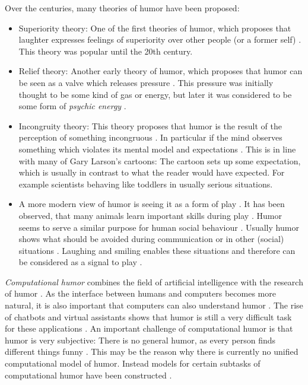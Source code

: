 \documentclass[draft,final,oneside]{vutinfth} %
\begin{document}
Over the centuries, many theories of humor have been proposed: 
\begin{itemize}
\item Superiority theory: One of the first theories of humor, which proposes that laughter expresses feelings of superiority over other people (or a former self) \cite{humorresearch}. This theory was popular until the 20th century.
\item Relief theory: Another early theory of humor, which proposes that humor can be seen as a valve which releases pressure \cite{humorresearch}. This pressure was initially thought to be some kind of gas or energy, but later it was considered to be some form of \textit{psychic energy} \cite{sep-humor}\cite{humorresearch}.
\item Incongruity theory: This theory proposes that humor is the result of the perception of something incongruous \cite{typologyofhumor}. In particular if the mind observes something which violates its mental model and expectations \cite{typologyofhumor}. This is in line with many of Gary Larson's cartoons: The cartoon sets up some expectation, which is usually in contrast to what the reader would have expected. For example scientists behaving like toddlers in usually serious situations. 

\item A more modern view of humor is seeing it as a form of play \cite{sep-humor}. It has been observed, that many animals learn important skills during play \cite{sep-humor}. Humor seems to serve a similar purpose for human social behaviour \cite{humorplay}. Usually humor shows what should be avoided during communication or in other (social) situations \cite{sep-humor}. Laughing and smiling enables these situations and therefore can be considered as a signal to play \cite{humorplay}. 

\end{itemize}


\textit{Computational humor} combines the field of artificial intelligence with the research of humor \cite{comphumordirections}. As the interface between humans and computers becomes more natural, it is also important that computers can also understand humor \cite{HumoristBot}. The rise of chatbots and virtual assistants shows that humor is still a very difficult task for these applications \cite{HumoristBot}. An important challenge of computational humor is that humor is very subjective: There is no general humor, as every person finds different things funny \cite{humorresearch}. This may be the reason why there is currently no unified computational model of humor. Instead models for certain subtasks of computational humor have been constructed \cite{Yang2015HumorRA}\cite{Bertero2016DeepLO}.
\end{document}
